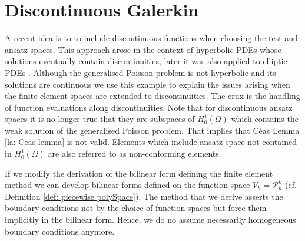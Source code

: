 \section{Discontinuous Galerkin} \label{sec: SIPG}
A recent idea is to to include discontinuous functions when choosing the test and ansatz spaces. This approach arose in the context of hyperbolic PDEs whose solutions eventually contain discontinuities, later it was also applied to elliptic PDEs \cite{ABC+2002}. Although the generalised Poisson problem is not hyperbolic and its solutions are continuous we use this example to explain the issues arising when the finite element spaces are extended to discontinuities. The crux is the handling of function evaluations along discontinuities. Note that for discontinuous ansatz spaces it is no longer true that they are subspaces of $H_0^1(\Omega)$ which contains the weak solution of the generalised Poisson problem. That implies that C\'eas Lemma \ref{la: Ceas lemma} is not valid. Elements which include ansatz space not contained in $H_0^1(\Omega)$ are also referred to as non-conforming elements.

If we modify the derivation of the bilinear form defining the finite element method we can develop bilinear forms defined on the function space $V_h = \mathcal P_h^k$ (cf. Definition \ref{def: piecewise polySpace}). The method that we derive asserts the boundary conditions not by the choice of function spaces but force them implicitly in the bilinear form. Hence, we do no assume necessarily homogeneous boundary conditions anymore.

